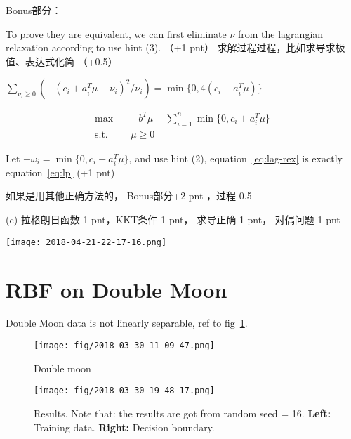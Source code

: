 \documentclass[12pt]{article}
\begin{document}
Bonus部分：

To prove they are equivalent, we can first eliminate $\nu$ from the lagrangian relaxation according to  use hint (3). （+1 pnt）  求解过程过程，比如求导求极值、表达式化简 （+0.5）

$\sum_{\nu_i \ge 0} (- ( c_i + a_i^T \mu -\nu_i)^2 / \nu_i) = \min\{0,4(c_i+a_i^T \mu)\}$

\begin{equation} \label{eq:lag-rex}
	\begin{aligned} 
		\max \quad & -b^T \mu + \sum_{i=1}^{n} \min\{0,c_i+a_i^T \mu\}  \\
		\textrm{s.t.} \quad &  \mu \ge 0  
	\end{aligned}
\end{equation}

Let $- \omega_i=\min\{0,c_i+a_i^T \mu\}$, and use hint (2), equation~\ref{eq:lag-rex} is exactly equation~\ref{eq:lp} (+1 pnt)
 
如果是用其他正确方法的， Bonus部分+2 pnt ，过程 0.5

(c) 拉格朗日函数 1 pnt，KKT条件 1 pnt， 求导正确 1 pnt， 对偶问题 1 pnt

\begin{center}
	\texttt{[image: 2018-04-21-22-17-16.png]}
\end{center}

\section{RBF on Double Moon}
Double Moon data is not linearly separable, ref to fig~\ref{fig:moon}.
\begin{figure}
	\centering
	\texttt{[image: fig/2018-03-30-11-09-47.png]}
	\caption{Double moon}  \label{fig:moon}
\end{figure}

\begin{figure}
	\centering
	\texttt{[image: fig/2018-03-30-19-48-17.png]}
	\caption{Results. Note that: the results  are got from random seed = 16. \textbf{Left:} Training data. \textbf{Right:} Decision boundary.} \label{fig:res}
\end{figure}
\end{document}
